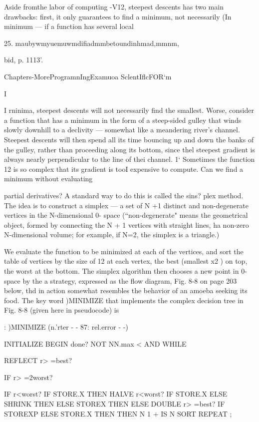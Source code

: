 {{{Aside fromthe labor of computing -V12, steepest descents has
two main drawbacks: ﬁrst, it only guarantees to ﬁnd a minimum,
not necessarily (In minimum — if a function has several local

 

25. maubywmyuemuwmdiﬁadmmbetoundinhmad,mmnm,

bid, p. 1113’.

Chapters-MoreProgramnIngExamuoa SclentIﬂcFOR‘m

I

I
rninima, steepest descents will not necessarily ﬁnd the smallest.
Worse, consider a function that has a minimum in the form of a
steep-sided gulley that winds slowly downhill to a declivity —
somewhat like a meandering river's channel. Steepest descents
will then spend all its time bouncing up and down the banks of
the gulley, rather than proceeding along its bottom, since thel
steepest gradient is always nearly perpendicular to the line of thei
channel. 1‘
Sometimes the function 12 is so complex that its gradient is tooI
expensive to compute. Can we ﬁnd a minimum without evaluating}
partial derivatives? A standard way to do this is called the sins?
plex method. The idea is to construct a simplex — a set of N +1
distinct and non-degenerate vertices in the N-dimensional 0-
space (“non-degenerate" means the geometrical object, formed
by connecting the N + 1 vertices with straight lines, ha non-zero
N-dimensional volume; for example, if N=2, the simplex is a
triangle.)

We evaluate the function to be minimized at each of the vertices,
and sort the table of vertices by the size of 12 at each vertex, the
best (smallest x2 ) on top, the worst at the bottom. The simplex
algorithm then chooses a new point in 0-space by the a strategy,
expressed as the ﬂow diagram, Fig. 8-8 on page 203 below, thd
in action somewhat resembles the behavior of an amoeba seeking
its food. The key word )MINIMIZE that implements the complex
decision tree in Fig. 8-8 (given here in pseudocode) is

: )MINIMIZE (n.'rter - - 87: rel.error - -)

INITIALIZE
BEGIN done? NOT NN.max < AND
WHILE

REFLECT r> =best?

IF r> =2worst?

IF r<worst? IF STORE.X THEN
HALVE r<worst?
IF STORE.X ELSE SHRINK THEN
ELSE STOREX THEN
ELSE DOUBLE r> =best?
IF STOREXP ELSE STORE.X THEN
THEN
N 1 + IS N SORT
REPEAT ;

}}

